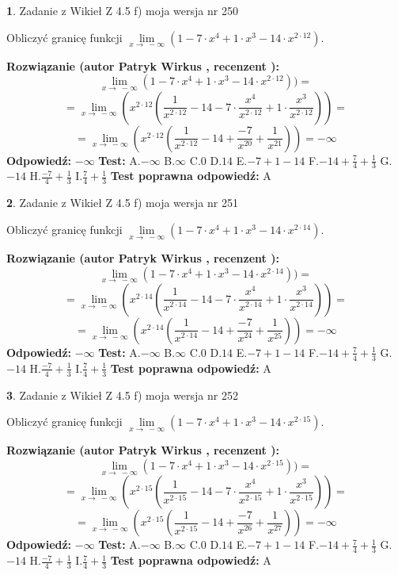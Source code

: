 \documentclass[12pt, a4paper]{article}
\theoremstyle{definition} %
\newtheorem{zad}{}
\newcommand{\zadStart}[1]{\begin{zad}#1\newline}
\newcommand{\zadStop}{\end{zad}}
\newcommand{\rozwStart}[2]{\noindent \textbf{Rozwiązanie (autor #1 , recenzent #2): }\newline}
\newcommand{\rozwStop}{\newline}
\newcommand{\odpStart}{\noindent \textbf{Odpowiedź:}\newline}
\newcommand{\odpStop}{\newline}
\newcommand{\testStart}{\noindent \textbf{Test:}\newline}
\newcommand{\testStop}{\newline}
\newcommand{\kluczStart}{\noindent \textbf{Test poprawna odpowiedź:}\newline}
\newcommand{\kluczStop}{\newline}
\begin{document}
\zadStart{Zadanie z Wikieł Z 4.5 f) moja wersja nr 250}



Obliczyć granicę funkcji  $\lim\limits_{x\to\ -\infty}(1 - 7 \cdot x^{4}+1 \cdot x^{3}- 14 \cdot x^{2\cdot12})$.
\zadStop
\rozwStart{Patryk Wirkus}{}
$$\lim\limits_{x\to\ -\infty}(1 - 7 \cdot x^{4}+1 \cdot x^{3}- 14 \cdot x^{2\cdot12}))=$$
$$=\lim\limits_{x\to\ -\infty}(x^{2\cdot12}(\frac{1}{x^{2\cdot12}}-14 -7 \cdot \frac{x^{4}}{x^{2\cdot12}}+1 \cdot \frac{x^{3}}{x^{2\cdot12}}))=$$
$$=\lim\limits_{x\to\ -\infty}(x^{2\cdot12}(\frac{1}{x^{2\cdot12}}-14 + \frac{-7}{x^{20}}+ \frac{1}{x^{21}}))=-\infty$$
\rozwStop
\odpStart
$-\infty$
\odpStop
\testStart
A.$-\infty$ B.$\infty$ C.$0$ D.$14$ E.$-7 + 1 - 14$
F.$-14+\frac{7}{4}+\frac{1}{3}$ G.$-14$
H.$\frac{-7}{4}+\frac{1}{3}$
I.$\frac{7}{4}+\frac{1}{3}$
\testStop
\kluczStart
A
\kluczStop



\zadStart{Zadanie z Wikieł Z 4.5 f) moja wersja nr 251}



Obliczyć granicę funkcji  $\lim\limits_{x\to\ -\infty}(1 - 7 \cdot x^{4}+1 \cdot x^{3}- 14 \cdot x^{2\cdot14})$.
\zadStop
\rozwStart{Patryk Wirkus}{}
$$\lim\limits_{x\to\ -\infty}(1 - 7 \cdot x^{4}+1 \cdot x^{3}- 14 \cdot x^{2\cdot14}))=$$
$$=\lim\limits_{x\to\ -\infty}(x^{2\cdot14}(\frac{1}{x^{2\cdot14}}-14 -7 \cdot \frac{x^{4}}{x^{2\cdot14}}+1 \cdot \frac{x^{3}}{x^{2\cdot14}}))=$$
$$=\lim\limits_{x\to\ -\infty}(x^{2\cdot14}(\frac{1}{x^{2\cdot14}}-14 + \frac{-7}{x^{24}}+ \frac{1}{x^{25}}))=-\infty$$
\rozwStop
\odpStart
$-\infty$
\odpStop
\testStart
A.$-\infty$ B.$\infty$ C.$0$ D.$14$ E.$-7 + 1 - 14$
F.$-14+\frac{7}{4}+\frac{1}{3}$ G.$-14$
H.$\frac{-7}{4}+\frac{1}{3}$
I.$\frac{7}{4}+\frac{1}{3}$
\testStop
\kluczStart
A
\kluczStop



\zadStart{Zadanie z Wikieł Z 4.5 f) moja wersja nr 252}



Obliczyć granicę funkcji  $\lim\limits_{x\to\ -\infty}(1 - 7 \cdot x^{4}+1 \cdot x^{3}- 14 \cdot x^{2\cdot15})$.
\zadStop
\rozwStart{Patryk Wirkus}{}
$$\lim\limits_{x\to\ -\infty}(1 - 7 \cdot x^{4}+1 \cdot x^{3}- 14 \cdot x^{2\cdot15}))=$$
$$=\lim\limits_{x\to\ -\infty}(x^{2\cdot15}(\frac{1}{x^{2\cdot15}}-14 -7 \cdot \frac{x^{4}}{x^{2\cdot15}}+1 \cdot \frac{x^{3}}{x^{2\cdot15}}))=$$
$$=\lim\limits_{x\to\ -\infty}(x^{2\cdot15}(\frac{1}{x^{2\cdot15}}-14 + \frac{-7}{x^{26}}+ \frac{1}{x^{27}}))=-\infty$$
\rozwStop
\odpStart
$-\infty$
\odpStop
\testStart
A.$-\infty$ B.$\infty$ C.$0$ D.$14$ E.$-7 + 1 - 14$
F.$-14+\frac{7}{4}+\frac{1}{3}$ G.$-14$
H.$\frac{-7}{4}+\frac{1}{3}$
I.$\frac{7}{4}+\frac{1}{3}$
\testStop
\kluczStart
A
\kluczStop
\end{document}
